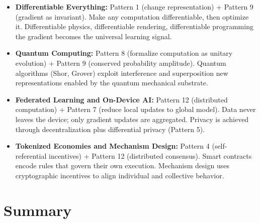 \begin{itemize}
\item \textbf{Differentiable Everything:} Pattern 1 (change representation) + Pattern 9 (gradient as invariant). Make any computation differentiable, then optimize it. Differentiable physics, differentiable rendering, differentiable programming the gradient becomes the universal learning signal.

\item \textbf{Quantum Computing:} Pattern 8 (formalize computation as unitary evolution) + Pattern 9 (conserved probability amplitude). Quantum algorithms (Shor, Grover) exploit interference and superposition new representations enabled by the quantum mechanical substrate.

\item \textbf{Federated Learning and On-Device AI:} Pattern 12 (distributed computation) + Pattern 7 (reduce local updates to global model). Data never leaves the device; only gradient updates are aggregated. Privacy is achieved through decentralization plus differential privacy (Pattern 5).

\item \textbf{Tokenized Economies and Mechanism Design:} Pattern 4 (self-referential incentives) + Pattern 12 (distributed consensus). Smart contracts encode rules that govern their own execution. Mechanism design uses cryptographic incentives to align individual and collective behavior.
\end{itemize}

\section{Summary}
\label{sec:anatomy:summary}

